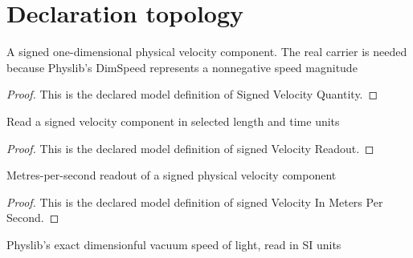 \section{Declaration topology}
\begin{definition}
  \label{def:physics:phyx-mini-0624:phyxminiproblems-problemphyxmini0624-signedvelocityquantity}
  A signed one-dimensional physical velocity component. The real carrier is needed because Physlib's DimSpeed represents a nonnegative speed magnitude
\end{definition}
\begin{proof}
  This is the declared model definition of Signed Velocity Quantity.
\end{proof}
\begin{definition}
  \label{def:physics:phyx-mini-0624:phyxminiproblems-problemphyxmini0624-signedvelocityreadout}
  Read a signed velocity component in selected length and time units
\end{definition}
\begin{proof}
  This is the declared model definition of signed Velocity Readout.
\end{proof}
\begin{definition}
  \label{def:physics:phyx-mini-0624:phyxminiproblems-problemphyxmini0624-signedvelocityinmeterspersecond}
  Metres-per-second readout of a signed physical velocity component
\end{definition}
\begin{proof}
  This is the declared model definition of signed Velocity In Meters Per Second.
\end{proof}
\begin{definition}
  \label{def:physics:phyx-mini-0624:phyxminiproblems-problemphyxmini0624-vacuumlightspeedinmeterspersecond}
  Physlib's exact dimensionful vacuum speed of light, read in SI units
\end{definition}
